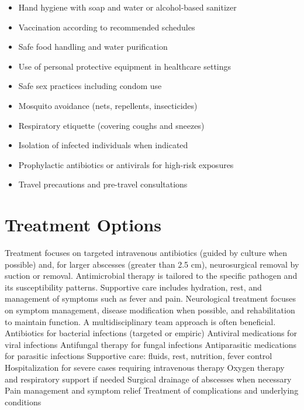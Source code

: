 \begin{itemize}[noitemsep]
  \item Hand hygiene with soap and water or alcohol-based sanitizer
  \item Vaccination according to recommended schedules
  \item Safe food handling and water purification
  \item Use of personal protective equipment in healthcare settings
  \item Safe sex practices including condom use
  \item Mosquito avoidance (nets, repellents, insecticides)
  \item Respiratory etiquette (covering coughs and sneezes)
  \item Isolation of infected individuals when indicated
  \item Prophylactic antibiotics or antivirals for high-risk exposures
  \item Travel precautions and pre-travel consultations
\end{itemize}
\section{Treatment Options}
Treatment focuses on targeted intravenous antibiotics (guided by culture when possible) and, for larger abscesses (greater than 2.5 cm), neurosurgical removal by suction or removal. Antimicrobial therapy is tailored to the specific pathogen and its susceptibility patterns. Supportive care includes hydration, rest, and management of symptoms such as fever and pain. Neurological treatment focuses on symptom management, disease modification when possible, and rehabilitation to maintain function. A multidisciplinary team approach is often beneficial. Antibiotics for bacterial infections (targeted or empiric) Antiviral medications for viral infections Antifungal therapy for fungal infections Antiparasitic medications for parasitic infections Supportive care: fluids, rest, nutrition, fever control Hospitalization for severe cases requiring intravenous therapy Oxygen therapy and respiratory support if needed Surgical drainage of abscesses when necessary Pain management and symptom relief Treatment of complications and underlying conditions

